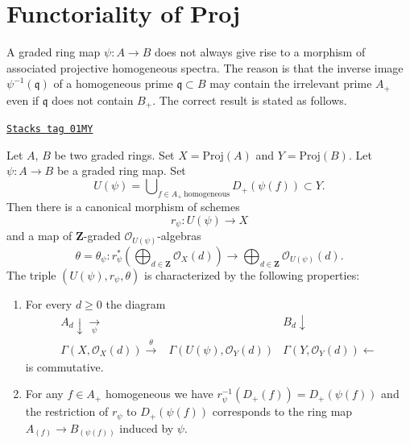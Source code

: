 \section{Functoriality of Proj}
\label{constructions-section-functoriality-proj}
A graded ring map $\psi : A \to B$ does not always give rise to a morphism of
associated projective homogeneous spectra. The reason is that
the inverse image $\psi^{-1}(\mathfrak q)$
of a homogeneous prime $\mathfrak q \subset B$ may
contain the irrelevant prime $A_{+}$ even if $\mathfrak q$ does not
contain $B_{+}$.
The correct result is stated as follows.

\begin{lemma}
\label{constructions-lemma-morphism-proj}
\href{https://stacks.math.columbia.edu/tag/01MY}{\texttt{Stacks tag 01MY}}

Let $A$, $B$ be two graded rings.
Set $X = \text{Proj}(A)$ and $Y = \text{Proj}(B)$.
Let $\psi : A \to B$ be a graded ring map.
Set
$$
U(\psi)
=
\bigcup\nolimits_{f \in A_{+}\ \text{homogeneous}} D_{+}(\psi(f))
\subset Y.
$$
Then there is a canonical morphism of schemes
$$
r_\psi :
U(\psi)
\longrightarrow
X
$$
and a map of $\mathbf{Z}$-graded $\mathcal{O}_{U(\psi)}$-algebras
$$
\theta = \theta_\psi :
r_\psi^*\left(
\bigoplus\nolimits_{d \in \mathbf{Z}} \mathcal{O}_X(d)
\right)
\longrightarrow
\bigoplus\nolimits_{d \in \mathbf{Z}} \mathcal{O}_{U(\psi)}(d).
$$
The triple $(U(\psi), r_\psi, \theta)$ is
characterized by the following properties:
\begin{enumerate}
\item For every $d \geq 0$ the diagram
$$
\begin{array}{ccc}A_d \downarrow\underset{\psi}{\longrightarrow} &  & B_d \downarrow \\ \Gamma(X, \mathcal{O}_X(d)) \overset{\theta}{\longrightarrow} & \Gamma(U(\psi), \mathcal{O}_Y(d)) & \Gamma(Y, \mathcal{O}_Y(d)) \longleftarrow\end{array}
$$
is commutative.
\item For any $f \in A_{+}$ homogeneous
we have $r_\psi^{-1}(D_{+}(f)) = D_{+}(\psi(f))$ and
the restriction of $r_\psi$ to $D_{+}(\psi(f))$
corresponds to the ring map
$A_{(f)} \to B_{(\psi(f))}$ induced by $\psi$.
\end{enumerate}
\end{lemma}

